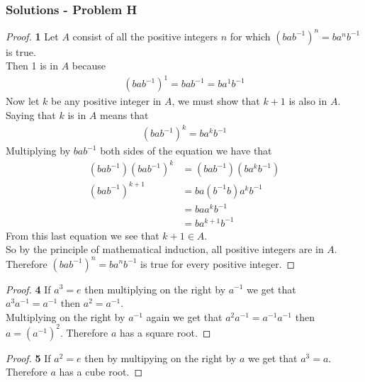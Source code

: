 \documentclass[11pt]{article}
\begin{document}
	\subsubsection*{Solutions - Problem H}
		\begin{proof}{\textbf{1}}
			Let $A$ consist of all the positive integers $n$ for which $(bab^{-1})^n = ba^{n}b^{-1}$ is true.\\
			Then 1 is in $A$ because
				\begin{align*}
					(bab^{-1})^1 = bab^{-1} = ba^1b^{-1}
				\end{align*}
			Now let $k$ be any positive integer in $A$, we must show that $k+1$ is also in $A$. Saying that $k$ is in $A$ means that
				\begin{align*}
					(bab^{-1})^k = ba^{k}b^{-1}
				\end{align*}
			Multiplying by $bab^{-1}$ both sides of the equation we have that
				\begin{align*}
					(bab^{-1})(bab^{-1})^k & = (bab^{-1})(ba^{k}b^{-1})\\
					(bab^{-1})^{k+1} & = ba(b^{-1}b)a^{k}b^{-1} \\
					& = baa^{k}b^{-1} \\
					& = ba^{k+1}b^{-1}
				\end{align*}
			From this last equation we see that $k+1 \in A$.\\
			So by the principle of mathematical induction, all positive integers are in $A$. Therefore $(bab^{-1})^n = ba^{n}b^{-1}$ is true for every positive integer.
		\end{proof}
		\begin{proof}{\textbf{4}}
			If $a^{3}=e$ then multiplying on the right by $a^{-1}$ we get that \\ $a^{3}a^{-1} =a^{-1}$ then $a^2=a^{-1}$.\\
			Multiplying on the right by $a^{-1}$ again we get that $a^{2}a^{-1} = a^{-1}a^{-1}$ then $a=(a^{-1})^{2}$. Therefore $a$ has a square root.
		\end{proof}
		\begin{proof}{\textbf{5}}
			If $a^{2}=e$ then by multipying on the right by $a$ we get that $a^{3} = a$. Therefore $a$ has a cube root.
		\end{proof}
\end{document}
